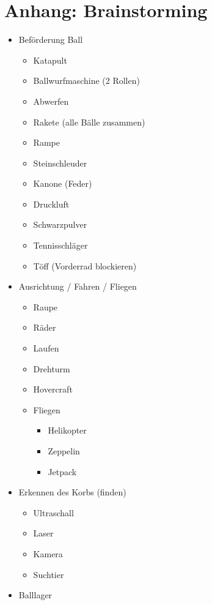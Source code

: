 \section{Anhang: Brainstorming}
\begin{itemize}
    \item Beförderung Ball
    \begin{itemize}
        \item Katapult
        \item Ballwurfmaschine (2 Rollen)
        \item Abwerfen
        \item Rakete (alle Bälle zusammen)
        \item Rampe
        \item Steinschleuder
        \item Kanone (Feder)
        \item Druckluft
        \item Schwarzpulver
        \item Tennisschläger
        \item Töff (Vorderrad blockieren)
    \end{itemize}
    \item Ausrichtung / Fahren / Fliegen
    \begin{itemize}
        \item Raupe
        \item Räder
        \item Laufen
        \item Drehturm
        \item Hovercraft
        \item Fliegen
        \begin{itemize}
            \item Helikopter
            \item Zeppelin
            \item Jetpack
        \end{itemize}
    \end{itemize}
    \item Erkennen des Korbs (finden)
    \begin{itemize}
        \item Ultraschall
        \item Laser
        \item Kamera
        \item Suchtier
    \end{itemize}
    \item Balllager

\end{itemize}
